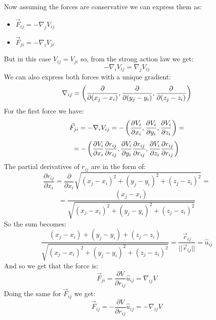 Now assuming the forces are conservative we can express them as:
\begin{itemize}
    \item $\vec{F}_{ij}= -\nabla_{j}V_{ij}$
    \item $\vec{F}_{ji}= -\nabla_{i}V_{ji}$
\end{itemize}
But in this case $V_{ij}=V_{ji}$ so, from the strong action law we get:
\begin{equation}
    -\nabla_iV_{ij}=\nabla_jV_{ij}
\end{equation}
We can also express both forces with a unique gradient:
\begin{equation}
    \nabla_{ij} = \left(\dfrac{\partial}{\partial(x_j-x_i)},\dfrac{\partial}{\partial(y_j-y_i)},\dfrac{\partial}{\partial(z_j-z_i)}\right)
\end{equation}
For the first force we have:
\begin{equation}
    \vec{F}_{ji}=-\nabla_iV_{ij}=-\left(\dfrac{\partial V_i}{\partial x_i },\dfrac{\partial V_i}{\partial y_i },\dfrac{\partial V_i}{\partial z_i }\right) =
\end{equation}
\begin{equation}
    =-\left(\dfrac{\partial V_i}{\partial x_i}\dfrac{\partial r_{ij}}{\partial r_{ij}},\dfrac{\partial V_i}{\partial y_i }\dfrac{\partial r_{ij}}{\partial r_{ij}},\dfrac{\partial V_i}{\partial z_i }\dfrac{\partial r_{ij}}{\partial r_{ij}}\right)
\end{equation}
The partial derivatives of $r_{ij}$ are in the form of:
\begin{equation}
    \dfrac{\partial r_{ij}}{\partial x_i} = \dfrac{\partial }{\partial x_i}\sqrt{(x_j-x_i)^2 + (y_j-y_i)^2+ (z_j-z_i)^2} =
\end{equation}
\begin{equation}
    = \dfrac{(x_j-x_i)}{\sqrt{(x_j-x_i)^2 + (y_j-y_i)^2+ (z_j-z_i)^2}}
\end{equation}
So the sum becomes:
\begin{equation}
    \dfrac{(x_j-x_i)+(y_j-y_i)+(z_j-z_i)}{\sqrt{(x_j-x_i)^2 + (y_j-y_i)^2+ (z_j-z_i)^2}} = \dfrac{\vec{r}_{ij}}{||\vec{r}_{ij}||} = \hat{u}_{ij}
\end{equation}
And so we get that the force is:
\begin{equation}
    \vec{F}_{ji}= \dfrac{\partial V}{\partial r_{ij}}\hat{u}_{ij} = \nabla_{ij}V
\end{equation}
Doing the same for $\vec{F}_{ij}$ we get:
\begin{equation}
    \vec{F}_{ij}= -\dfrac{\partial V}{\partial r_{ij}}\hat{u}_{ij}= -\nabla_{ij}V
\end{equation}
